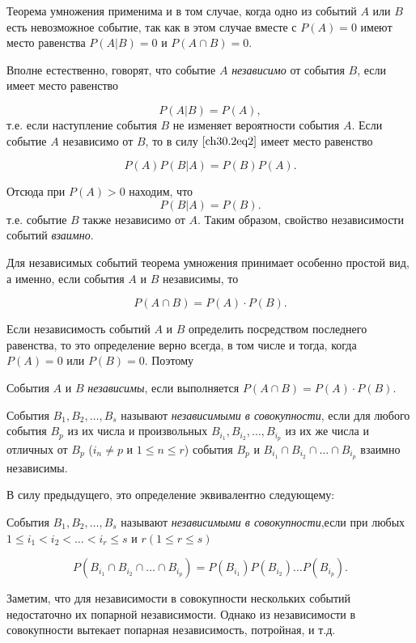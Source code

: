 Теорема умножения применима и в том случае, когда одно из событий $A$ или $B$ есть невозможное событие, так как в этом случае вместе с $P(A) = 0$ имеют место равенства $P(A|B) = 0$ и $P(A\cap B) = 0$.

Вполне естественно, говорят, что событие $A$ \textit{независимо} от события $B$, если имеет место равенство

\begin{equation} \label{ch30.2eq3}
P(A|B) = P(A),
\end{equation}
т.е. если наступление события $B$ не изменяет вероятности события $A$. Если событие $A$ независимо от $B$, то в силу $\eqref{ch30.2eq2}$ имеет место равенство

$$
P(A)P(B|A) = P(B)P(A).
$$

Отсюда при $P(A) > 0$ находим, что
\begin{equation} \label{ch30.2eq4}
P(B|A) = P(B).
\end{equation}
т.е. событие $B$ также независимо от $A$. Таким образом, свойство независимости событий \textit{взаимно}.

Для независимых событий теорема умножения принимает особенно простой вид, а именно, если события $A$ и $B$ независимы, то

$$
P(A\cap B) = P(A) \cdot P(B).
$$

Если независимость событий $A$ и $B$ определить посредством последнего равенства, то это определение верно всегда, в том числе и тогда, когда $P(A) = 0$ или $P(B) = 0$. Поэтому
\begin{defn}
События $A$ и $B$ \textit{независимы}, если выполняется $P(A\cap B) = P(A)\cdot P(B)$.
\end{defn}

События $B_1,B_2, \ldots, B_s$ называют \textit{независимыми в совокупности}, если для любого события $B_p$ из их числа и произвольных $B_{i_1}, B_{i_2}, \ldots, B_{i_p}$ из их же числа и отличных от $B_p$  ($i_n \not= p$  и $1 \le n \le r$) события $B_p$ и $B_{i_1}\cap B_{i_2}\cap \ldots\cap B_{i_p}$ взаимно независимы.

В силу предыдущего, это определение эквивалентно следующему:
\begin{defn} События $B_1,B_2, \ldots, B_s$ называют \textit{независимыми в совокупности},если при любых $1 \le i_1 < i_2 < \ldots < i_r \le s$ и $r(1 \le r \le s)$

$$
P(B_{i_1}\cap B_{i_2}\cap\ldots\cap B_{i_p}) = P(B_{i_1})P(B_{i_2}) \ldots P(B_{i_p}).
$$
\end{defn}
Заметим, что для независимости в совокупности нескольких событий недостаточно их попарной независимости. Однако из независимости в совокупности вытекает попарная независимость, потройная, и т.д.


